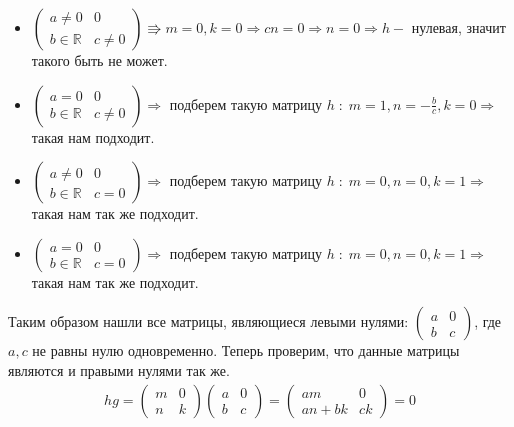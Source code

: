 \documentclass[a4paper,11pt]{article}
\begin{document}
\begin{itemize}
	\item $ \begin{pmatrix}
	a \neq 0 & 0 \\[2pt]
	b \in \mathbb{R} & c \neq 0
	\end{pmatrix} \Rrightarrow m = 0, k = 0 \Rightarrow cn = 0 \Rightarrow n = 0 \Rightarrow h - $ нулевая, значит такого быть не может.
	\item  $ \begin{pmatrix}
	a = 0 & 0 \\[2pt]
	b \in \mathbb{R} & c \neq 0
	\end{pmatrix} \Rightarrow $ подберем такую матрицу $ h \; : \; m = 1, n = -\frac{b}{c}, k = 0 \Rightarrow $ такая нам подходит.
	\item  $ \begin{pmatrix}
	a \neq 0 & 0 \\[2pt]
	b \in \mathbb{R} & c = 0
	\end{pmatrix} \Rightarrow $ подберем такую матрицу $ h \; : \; m = 0, n = 0, k = 1 \Rightarrow $ такая нам так же подходит.
	\item  $ \begin{pmatrix}
	a = 0 & 0 \\[2pt]
	b \in \mathbb{R} & c = 0
	\end{pmatrix} \Rightarrow $ подберем такую матрицу $ h \; : \; m = 0, n = 0, k = 1 \Rightarrow $ такая нам так же подходит.
\end{itemize}
Таким образом нашли все матрицы, являющиеся левыми нулями: $ \begin{pmatrix}
	a & 0 \\[2pt]
	b & c
\end{pmatrix} $, где $ a, c $ не равны нулю одновременно. Теперь проверим, что данные матрицы являются и правыми нулями так же.
\begin{gather*}
	hg = \begin{pmatrix}
	m & 0 \\[2pt]
	n & k
	\end{pmatrix}
	\begin{pmatrix}
	a & 0 \\[2pt]
	b & c
	\end{pmatrix} = 
	\begin{pmatrix}
	am & 0 \\[2pt]
	an + bk & ck
	\end{pmatrix}
	= 0
\end{gather*}
\end{document}
